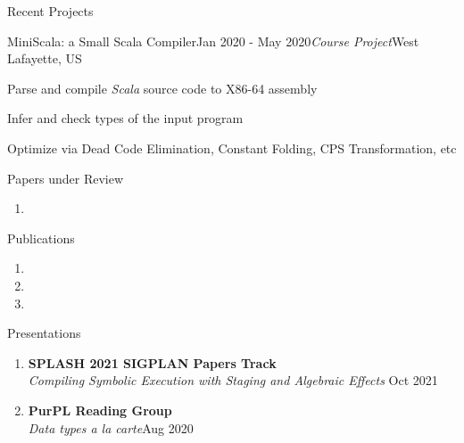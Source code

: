 \documentclass{resume} %
\begin{document}
\begin{rSection}{Recent Projects}
\begin{rSubsection}{MiniScala: a Small Scala Compiler}{Jan 2020 - May 2020}{\textit{Course Project}}{West Lafayette, US}
\item Parse and compile \textit{Scala} source code to X86-64 assembly
\item Infer and check types of the input program
\item Optimize via Dead Code Elimination, Constant Folding, CPS Transformation, etc

\end{rSubsection}


\end{rSection}

\begin{rSection}{Papers under Review}
    \begin{enumerate}
        \item {}
    \end{enumerate}
\end{rSection}

\begin{rSection}{Publications}
\begin{enumerate}
    \item {}
    \item {}
    \item {}
\end{enumerate}



\end{rSection}

\begin{rSection}{Presentations}
\begin{enumerate}
\item \textbf{SPLASH 2021 SIGPLAN Papers Track}\\
\textit{Compiling Symbolic Execution with Staging and Algebraic Effects} \hfill Oct 2021
\item \textbf{PurPL Reading Group} \\
\textit{Data types a la carte}\hfill Aug 2020
\end{enumerate}


\end{rSection}
\end{document}
